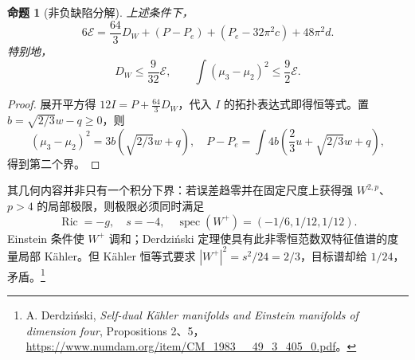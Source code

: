 \documentclass[UTF8,fontset=fandol,zihao=-4,oneside,openany]{ctexbook}
\theoremstyle{cjkplain}
\newtheorem{proposition}[theorem]{命题}
\numberwithin{equation}{chapter}
\DeclareMathOperator{\Ric}{Ric}
\begin{document}
\begin{proposition}[非负缺陷分解]\label{FND:defect}
上述条件下，
\begin{equation}\label{FND:defectidentity}
6\mathcal E=
\frac{64}{3}D_W+(P-P_e)+(P_e-32\pi^2c)+48\pi^2d.
\end{equation}
特别地，
\[
D_W\le\frac9{32}\mathcal E,\qquad
\int(\mu_3-\mu_2)^2\le\frac92\mathcal E.
\]
\end{proposition}
\begin{proof}
展开平方得 \(12I=P+\frac{64}{3}D_W\)，代入 \(I\) 的拓扑表达式即得恒等式。置
\(b=\sqrt{2/3}w-q\ge0\)，则
\[
(\mu_3-\mu_2)^2=3b\left(\sqrt{2/3}w+q\right),\quad
P-P_e=\int4b\left(\frac23u+\sqrt{2/3}w+q\right),
\]
得到第二个界。
\end{proof}
其几何内容并非只有一个积分下界：若误差趋零并在固定尺度上获得强 \(W^{2,p}\)、\(p>4\) 的局部极限，则极限必须同时满足
\[
\Ric=-g,\quad s=-4,\quad
\operatorname{spec}(W^+)=(-1/6,1/12,1/12).
\]
Einstein 条件使 \(W^+\) 调和；Derdziński 定理使具有此非零恒范数双特征值谱的度量局部 Kähler。但 Kähler 恒等式要求
\(|W^+|^2=s^2/24=2/3\)，目标谱却给 \(1/24\)，矛盾。\footnote{A. Derdziński, \emph{Self-dual Kähler manifolds and Einstein manifolds of dimension four}, Propositions 2、5，\url{https://www.numdam.org/item/CM_1983__49_3_405_0.pdf}。}
\end{document}
